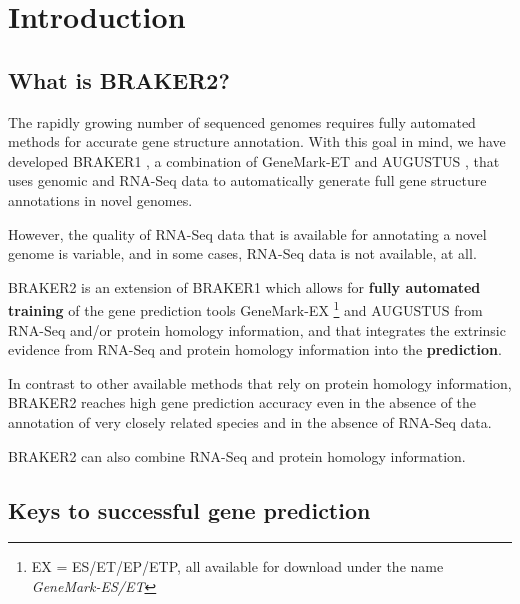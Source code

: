 \documentclass[]{article}
\begin{document}
\hypertarget{introduction}{\section{Introduction}\label{introduction}}

\hypertarget{what-is-braker2}{\subsection{What is
BRAKER2?}\label{what-is-braker2}}

The rapidly growing number of sequenced genomes requires fully automated
methods for accurate gene structure annotation. With this goal in mind,
we have developed BRAKER1 \cite{braker1}, a combination of GeneMark-ET
\cite{GeneMark-ET} and AUGUSTUS \cite{AUGUSTUS,stanke2006gene}, that
uses genomic and RNA-Seq data to automatically generate full gene
structure annotations in novel genomes.

However, the quality of RNA-Seq data that is available for annotating a
novel genome is variable, and in some cases, RNA-Seq data is not
available, at all.

BRAKER2 is an extension of BRAKER1 which allows for \textbf{fully
automated training} of the gene prediction tools GeneMark-EX
\cite{AlexandreLomsadze11282005,ter2008gene,GeneMark-ET}\footnote{EX
  = ES/ET/EP/ETP, all available for download under the name
  \emph{GeneMark-ES/ET}} and AUGUSTUS from RNA-Seq and/or protein
homology information, and that integrates the extrinsic evidence from
RNA-Seq and protein homology information into the \textbf{prediction}.

In contrast to other available methods that rely on protein homology
information, BRAKER2 reaches high gene prediction accuracy even in the
absence of the annotation of very closely related species and in the
absence of RNA-Seq data.

BRAKER2 can also combine RNA-Seq and protein homology information.

\hypertarget{keys-to-successful-gene-prediction}{\subsection{Keys to
successful gene prediction}\label{keys-to-successful-gene-prediction}}
\end{document}
